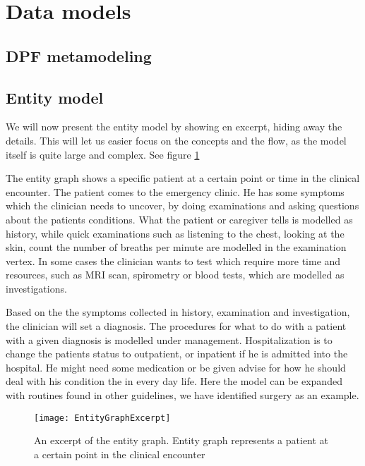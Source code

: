 \section{Data models}

\subsection{DPF metamodeling}
\subsection{Entity model}

We will now present the entity model by showing en excerpt, hiding away the details. This will let us easier focus on the concepts and the flow, as the model itself is quite large and complex. See figure \ref{fig:EntityGraphExcerpt}

The entity graph shows a specific patient at a certain point or time in the clinical encounter. The patient comes to the emergency clinic. He has some symptoms which the clinician needs to uncover, by doing examinations and asking questions about the patients conditions. What the patient or caregiver tells is modelled as history, while quick examinations such as listening to the chest, looking at the skin, count the number of breaths per minute are modelled in the examination vertex. In some cases the clinician wants to test which require more time and resources, such as MRI scan, spirometry or blood tests, which are modelled as investigations.

Based on the the symptoms collected in history, examination and investigation, the clinician will set a diagnosis. The procedures for what to do with a patient with a given diagnosis is modelled under management. Hospitalization is to change the patients status to outpatient, or inpatient if he is admitted into the hospital. He might need some medication or be given advise for how he should deal with his condition the in every day life. Here the model can be expanded with routines found in other guidelines, we have identified surgery as an example. 
\begin{figure}[h!]
	\caption {An excerpt of the entity graph. Entity graph represents a patient at a certain point in the clinical encounter}
	\label{fig:EntityGraphExcerpt}
	\texttt{[image: EntityGraphExcerpt]}
\end{figure}

